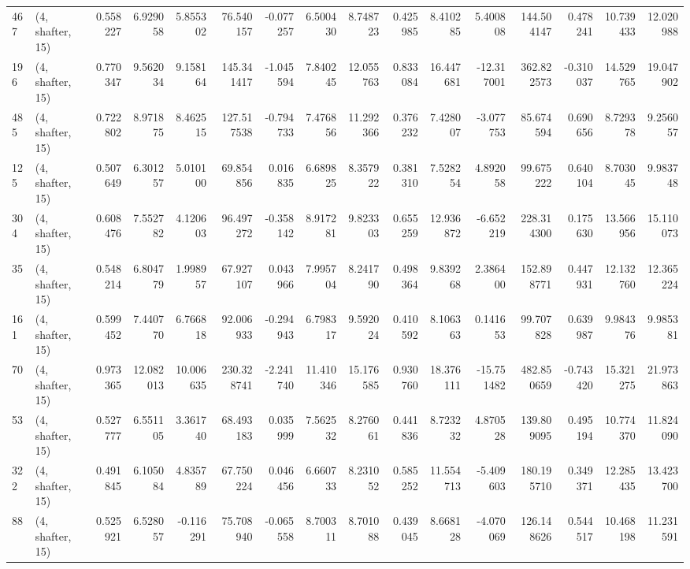 \begin{tabular}{llrrrrrrrrrrrrrr}
467 &  (4, shafter, 15) &   0.558227 &   6.929058 &   5.855302 &    76.540157 &  -0.077257 &   6.500430 &   8.748723 &  0.425985 &   8.410285 &   5.400808 &   144.504147 &   0.478241 &  10.739433 &  12.020988 \\
196 &  (4, shafter, 15) &   0.770347 &   9.562034 &   9.158164 &   145.341417 &  -1.045594 &   7.840245 &  12.055763 &  0.833084 &  16.447681 & -12.317001 &   362.822573 &  -0.310037 &  14.529765 &  19.047902 \\
485 &  (4, shafter, 15) &   0.722802 &   8.971875 &   8.462515 &   127.517538 &  -0.794733 &   7.476856 &  11.292366 &  0.376232 &   7.428007 &  -3.077753 &    85.674594 &   0.690656 &   8.729378 &   9.256057 \\
125 &  (4, shafter, 15) &   0.507649 &   6.301257 &   5.010100 &    69.854856 &   0.016835 &   6.689825 &   8.357922 &  0.381310 &   7.528254 &   4.892058 &    99.675222 &   0.640104 &   8.703045 &   9.983748 \\
304 &  (4, shafter, 15) &   0.608476 &   7.552782 &   4.120603 &    96.497272 &  -0.358142 &   8.917281 &   9.823303 &  0.655259 &  12.936872 &  -6.652219 &   228.314300 &   0.175630 &  13.566956 &  15.110073 \\
35  &  (4, shafter, 15) &   0.548214 &   6.804779 &   1.998957 &    67.927107 &   0.043966 &   7.995704 &   8.241790 &  0.498364 &   9.839268 &   2.386400 &   152.898771 &   0.447931 &  12.132760 &  12.365224 \\
161 &  (4, shafter, 15) &   0.599452 &   7.440770 &   6.766818 &    92.006933 &  -0.294943 &   6.798317 &   9.592024 &  0.410592 &   8.106363 &   0.141653 &    99.707828 &   0.639987 &   9.984376 &   9.985381 \\
70  &  (4, shafter, 15) &   0.973365 &  12.082013 &  10.006635 &   230.328741 &  -2.241740 &  11.410346 &  15.176585 &  0.930760 &  18.376111 & -15.751482 &   482.850659 &  -0.743420 &  15.321275 &  21.973863 \\
53  &  (4, shafter, 15) &   0.527777 &   6.551105 &   3.361740 &    68.493183 &   0.035999 &   7.562532 &   8.276061 &  0.441836 &   8.723232 &   4.870528 &   139.809095 &   0.495194 &  10.774370 &  11.824090 \\
322 &  (4, shafter, 15) &   0.491845 &   6.105084 &   4.835789 &    67.750224 &   0.046456 &   6.660733 &   8.231052 &  0.585252 &  11.554713 &  -5.409603 &   180.195710 &   0.349371 &  12.285435 &  13.423700 \\
88  &  (4, shafter, 15) &   0.525921 &   6.528057 &  -0.116291 &    75.708940 &  -0.065558 &   8.700311 &   8.701088 &  0.439045 &   8.668128 &  -4.070069 &   126.148626 &   0.544517 &  10.468198 &  11.231591 \\

\end{tabular}
